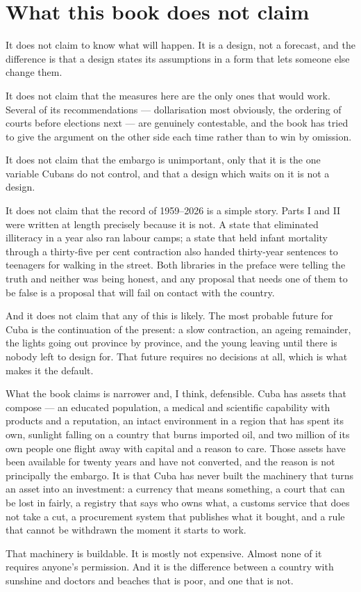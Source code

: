 \section{What this book does not claim}

It does not claim to know what will happen. It is a design, not a forecast, and
the difference is that a design states its assumptions in a form that lets
someone else change them.

It does not claim that the measures here are the only ones that would work.
Several of its recommendations --- dollarisation most obviously, the ordering of
courts before elections next --- are genuinely contestable, and the book has
tried to give the argument on the other side each time rather than to win by
omission.

It does not claim that the embargo is unimportant, only that it is the one
variable Cubans do not control, and that a design which waits on it is not a
design.

It does not claim that the record of 1959--2026 is a simple story. Parts I and II
were written at length precisely because it is not. A state that eliminated
illiteracy in a year also ran labour camps; a state that held infant mortality
through a thirty-five per cent contraction also handed thirty-year sentences
to teenagers for walking in the street. Both libraries in the preface were
telling the truth and neither was being honest, and any proposal that needs one
of them to be false is a proposal that will fail on contact with the country.

And it does not claim that any of this is likely. The most probable future for
Cuba is the continuation of the present: a slow contraction, an ageing remainder,
the lights going out province by province, and the young leaving until there is
nobody left to design for. That future requires no decisions at all, which is
what makes it the default.

What the book claims is narrower and, I think, defensible. Cuba has assets that
compose --- an educated population, a medical and scientific capability with
products and a reputation, an intact environment in a region that has spent its
own, sunlight falling on a country that burns imported oil, and two million of
its own people one flight away with capital and a reason to care. Those assets
have been available for twenty years and have not converted, and the reason is
not principally the embargo. It is that Cuba has never built the machinery that
turns an asset into an investment: a currency that means something, a court that
can be lost in fairly, a registry that says who owns what, a customs service that
does not take a cut, a procurement system that publishes what it bought, and a
rule that cannot be withdrawn the moment it starts to work.

That machinery is buildable. It is mostly not expensive. Almost none of it
requires anyone's permission. And it is the difference between a country with
sunshine and doctors and beaches that is poor, and one that is not.
